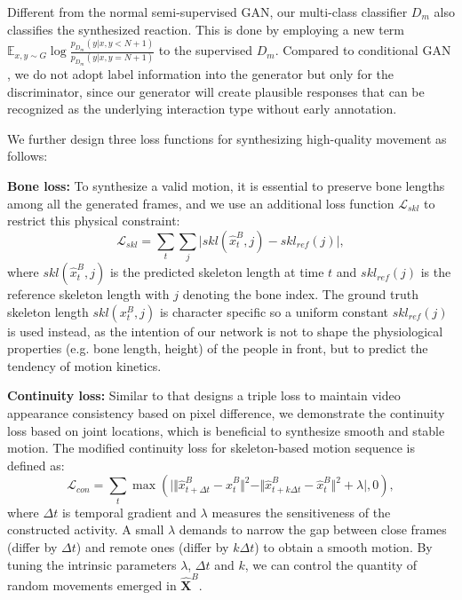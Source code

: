 \documentclass[times,twocolumn,final]{elsarticle}
\begin{document}
Different from the normal semi-supervised GAN, our multi-class classifier $D_{m}$ also classifies the synthesized reaction. This is done by employing a new term $\mathbb{E}_{x,y\sim G}\log\frac{p_{D_{m}}(y|x,y<N+1)}{p_{D_{m}}(y|x,y=N+1)}$ to the supervised $D_{m}$.
Compared to conditional GAN \cite{mirza2014conditional}, we do not adopt label information into the generator but only for the discriminator, since our generator will create plausible responses that can be recognized as the underlying interaction type without early annotation.

We further design three loss functions for synthesizing high-quality movement as follows:

\textbf{Bone loss:} To synthesize a valid motion, it is essential to preserve bone lengths among all the generated frames, and we use an additional loss function $\mathcal{L}_{skl}$ to restrict this physical constraint:
\begin{equation}
\mathcal{L}_{skl}=\sum_{t}\sum_{j}\big\vert skl(\hat{x}_{t}^{B},j)-skl_{ref}(j)\big\vert\label{eq:bone},
\end{equation}
where $skl(\hat{x}_{t}^{B},j)$ is the predicted skeleton length at time $t$ and $skl_{ref}(j)$ is the reference skeleton length with $j$ denoting the bone index. The ground truth skeleton length $skl(x_{t}^{B},j)$ is character specific so a uniform constant $skl_{ref}(j)$ is used instead, as the intention of our network is not to shape the physiological properties (e.g. bone length, height) of the people in front, %
but to predict the tendency of motion kinetics.

\textbf{Continuity loss:} Similar to \cite{yan2017skeleton} that designs a triple loss to maintain video appearance consistency based on pixel difference, we demonstrate the continuity loss based on joint locations, which is beneficial to synthesize smooth and stable motion. The modified continuity loss for skeleton-based motion sequence is defined as:
\begin{equation}
\mathcal{L}_{con}=\sum_{t}\max(\vert \Vert \hat{x}_{t+\Delta t}^{B}-\hat{x}_{t}^{B}\Vert^{2}-\Vert \hat{x}_{t+k\Delta t}^{B}-\hat{x}_{t}^{B}\Vert^{2}+\lambda\vert,0),
\end{equation}
where $\Delta t$ is temporal gradient and $\lambda$ measures the sensitiveness of the constructed activity. A small $\lambda$ demands to narrow the gap between close frames (differ by $\Delta t$) and remote ones (differ by $k\Delta t$) to obtain a smooth motion. By tuning the intrinsic parameters $\lambda$, $\Delta t$ and $k$, we can control the quantity of random movements emerged in $\mathbf{\hat{X}}^{B}$.
\end{document}
